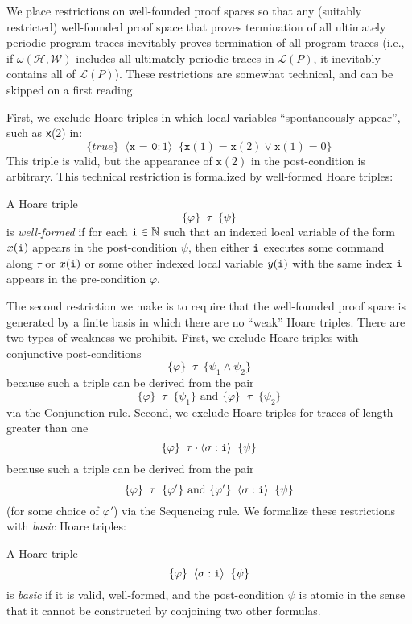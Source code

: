 \documentclass[9pt,nocopyrightspace]{sigplanconf}
\theoremstyle{definition}
\newcommand{\tuple}[1]{\langle #1 \rangle}
\newcommand{\true}{\textit{true}}
\newcommand{\hoare}[3]{\{{#1}\}\;\;#2\;\;\{{#3}\}}
\newcommand{\idx}[1]{\text{\rm\texttt{#1}}}
\newcommand{\ic}[2]{{\tuple{#1 : #2}}}
\newcommand{\lang}{\mathcal{L}}
\renewcommand{\phi}{\varphi}
\begin{document}
We place restrictions on well-founded proof spaces so that any (suitably restricted)
well-founded proof space that proves termination of all ultimately periodic
program traces inevitably proves termination of all program traces (i.e., if $\omega(\mathscr{H},\mathscr{W})$ includes all ultimately periodic
traces in $\lang(P)$, it inevitably contains all of $\lang(P)$).  These
restrictions are somewhat technical, and can be skipped on a first reading.

First, we exclude Hoare triples in
which local variables ``spontaneously appear'', such as \texttt{x}(2) in:
\[\hoare{\true}{\ic{\texttt{x = 0}}{1}}{\texttt{x}(1) = \texttt{x}(2) \lor \texttt{x}(1)=0}\]
This triple is valid, but the appearance of $\texttt{x}(2)$ in the post-condition is
arbitrary.  This technical restriction is formalized by well-formed Hoare
triples:
\begin{definition} \label{def:wfht}
  A Hoare triple \[\hoare{\phi}{\tau}{\psi}\] is \emph{well-formed} if for each
  $\idx{i} \in \mathbb{N}$ such that an indexed local variable of the form
  $x(\idx{i})$ appears in the post-condition $\psi$, then either $\idx{i}$
  executes some command along $\tau$ or $x(\idx{i})$ or some other indexed
  local variable $y(\idx{i})$ with the same index $\idx{i}$ appears in the
  pre-condition $\phi$.
\end{definition}

The second restriction we make is to require that the well-founded proof space is generated by a finite basis in which there are no ``weak'' Hoare triples.  There are two types of weakness we prohibit. First, we exclude Hoare triples with conjunctive post-conditions
\[\hoare{\phi}{\tau}{\psi_1 \land \psi_2}\]
because such a triple can be derived from the pair 
\[\hoare{\phi}{\tau}{\psi_1} \text{ and } \hoare{\phi}{\tau}{\psi_2}\]
via the {\sc Conjunction} rule.  Second, we exclude Hoare triples for traces of length greater than one
\[\hoare{\phi}{\tau\cdot\ic{\sigma}{\idx{i}}}{\psi}\]
because such a triple can be derived from the pair
\[\hoare{\phi}{\tau}{\phi'} \text{ and } \hoare{\phi'}{\ic{\sigma}{\idx{i}}}{\psi}\]
(for some choice of $\phi'$) via the {\sc Sequencing} rule.  We formalize
these restrictions with \emph{basic} Hoare triples:
\begin{definition}
  A Hoare triple
  \[ \hoare{\phi}{\ic{\sigma}{\idx{i}}}{\psi} \]
  is \emph{basic} if it is valid, well-formed, and
  the post-condition $\psi$ is atomic in the sense that it cannot be
  constructed by conjoining two other formulas.
\end{definition}
\end{document}
